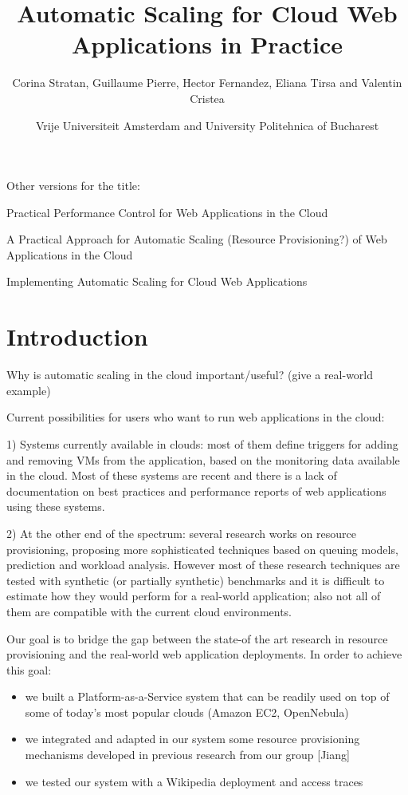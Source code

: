 \documentclass[10pt,twocolumn]{article}
\begin{document}
\begin{multicols}{2}
\title{Automatic Scaling for Cloud Web Applications in Practice}
\author{Corina Stratan, Guillaume Pierre, Hector Fernandez, Eliana Tirsa and Valentin Cristea} 
\date{Vrije Universiteit Amsterdam and University Politehnica of Bucharest}
\maketitle
\end{multicols}


Other versions for the title:

Practical Performance Control for Web Applications in the Cloud

A Practical Approach for Automatic Scaling (Resource Provisioning?) of
Web Applications in the Cloud

Implementing Automatic Scaling for Cloud Web Applications


\section*{Introduction}

Why is automatic scaling in the cloud important/useful? (give a real-world example)

Current possibilities for users who want to run web applications in the
cloud: 

1) Systems currently available in clouds: most of them define triggers for 
adding and removing VMs from the application, based on the monitoring 
data available in the cloud. Most of these systems are recent and there 
is a lack of documentation on best practices
and performance reports of web applications using these systems. 

2) At the other end of the spectrum: several research works on resource 
provisioning, proposing more sophisticated techniques based on
queuing models, prediction and workload analysis. However most of these
research techniques are tested with synthetic (or partially synthetic)
benchmarks and it is difficult to estimate how they would perform
for a real-world application; also not all of them are compatible
with the current cloud environments.

Our goal is to bridge the gap between the state-of the art research in
resource provisioning and the real-world web application deployments.
In order to achieve this goal:

\begin{itemize}
\item we built a Platform-as-a-Service system that can be readily used
on top of some of today's most popular clouds (Amazon EC2, OpenNebula)
\item we integrated and adapted in our system some resource  provisioning 
mechanisms developed in previous research from our group [Jiang]
\item we tested our system with a Wikipedia deployment and access
traces  
\end{itemize}   
\end{document}
